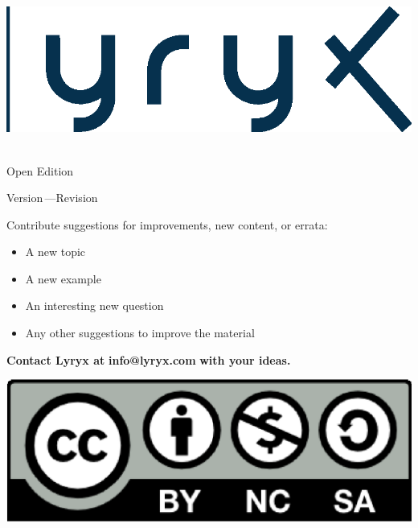 \setcounter{page}{1}
\thispagestyle{empty}
\vspace{-3em}
\begin{center}
	\includegraphics[width=.4\textwidth]{figures/lyryxlogo-blue.eps}
\end{center}

\vspace{-2em}

\begin{center}
 {\fontsize{24pt}{22pt}\headerfont \textcolor{primarycolour}{\booktitle\;\booksubtitle}} \\ 
{\fontsize{16pt}{20pt}\subheaderfont \textcolor{secondarycolour}{Open Edition}} 
\smallskip

{\fontsize{16pt}{20pt}\subheaderfont\textcolor{secondarycolour}{Version\,\version \enskip---\enskip Revision\,\revision}} 
\end{center}


\setlength{\parskip}{0pt}

\bigskip



\medskip

{\subheaderfont
\noindent Contribute suggestions for improvements, new content, or errata: 
\begin{itemize}
\item[\textcolor{secondarycolour}{\textbullet}] A new topic 
\item[\textcolor{secondarycolour}{\textbullet}] A new example 
\item[\textcolor{secondarycolour}{\textbullet}] An interesting new question 
\item[\textcolor{secondarycolour}{\textbullet}] Any other suggestions to improve the material
\end{itemize}}

\medskip

{\subheaderfont
\noindent \textcolor{primarycolour}{\textbf{Contact Lyryx at} }\textcolor{secondarycolour}{\textbf{info@lyryx.com }}\textcolor{primarycolour}{ \textbf{with your ideas.}}}


\vfill



\noindent \includegraphics[scale=.2]{figures/cc-by-nc-sa.eps} \\


